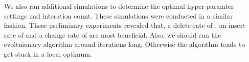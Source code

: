 \documentclass[./../../paper.tex]{subfiles}
\begin{document}
We also ran additional simulations to determine the optimal hyper paramter settings nad interation count. These simulations were conducted in a similar fashion. These preliminary experiments revealed that, a delete-rate of , an insert rate of  and a change rate of  are most beneficial. Also, we should run the evoltuionary algorithm around  iterations long. Otherwise the algorithm tends to get stuck in a local optimum.
\end{document}
